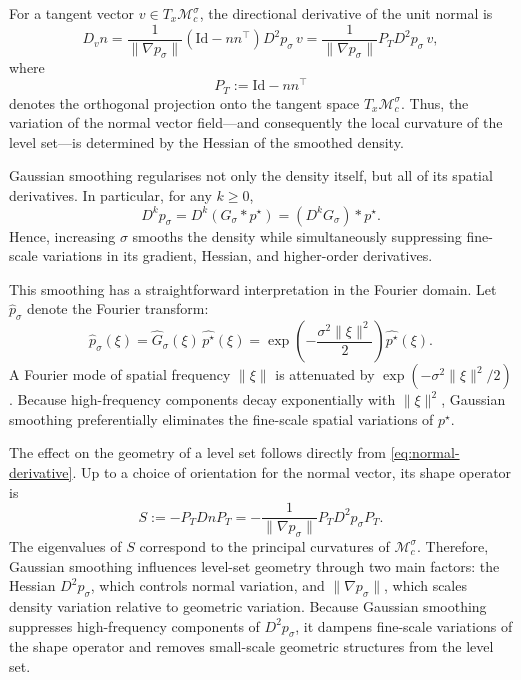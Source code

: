 \documentclass{article}
\newcommand{\M}{\mathcal{M}}
\newcommand{\Id}{\mathrm{Id}}
\theoremstyle{plain}
\theoremstyle{definition}
\theoremstyle{remark}
\begin{document}
For a tangent vector $v \in T_x\M_c^\sigma$, the directional derivative of the unit normal is
\begin{equation}
    D_v n
    =
    \frac{1}{\|\nabla p_{\sigma}\|}
    \left(\Id - n n^\top\right)
    D^2 p_{\sigma}\,v
    =
    \frac{1}{\|\nabla p_{\sigma}\|}
    P_T D^2 p_{\sigma}\,v,
    \label{eq:normal-derivative}
\end{equation}
where
\begin{equation}
    P_T := \Id - n n^\top
\end{equation}
denotes the orthogonal projection onto the tangent space $T_x\M_c^\sigma$. Thus, the variation of the normal vector field—and consequently the local curvature of the level set—is determined by the Hessian of the smoothed density.

Gaussian smoothing regularises not only the density itself, but all of its spatial derivatives. In particular, for any $k \geq 0$,
\begin{equation}
    D^k p_{\sigma}
    =
    D^k(G_{\sigma} * p^\star)
    =
    (D^k G_{\sigma}) * p^\star.
    \label{eq:derivative-smoothing}
\end{equation}
Hence, increasing $\sigma$ smooths the density while simultaneously suppressing fine-scale variations in its gradient, Hessian, and higher-order derivatives.

This smoothing has a straightforward interpretation in the Fourier domain. Let $\widehat{p}_{\sigma}$ denote the Fourier transform:
\begin{equation}
    \widehat{p}_{\sigma}(\xi)
    =
    \widehat{G}_{\sigma}(\xi)\,
    \widehat{p^\star}(\xi)
    =
    \exp\!\left(-\frac{\sigma^2\|\xi\|^2}{2}\right)
    \widehat{p^\star}(\xi).
    \label{eq:fourier-smoothing}
\end{equation}
A Fourier mode of spatial frequency $\|\xi\|$ is attenuated by $\exp(-\sigma^2\|\xi\|^2/2)$. Because high-frequency components decay exponentially with $\|\xi\|^2$, Gaussian smoothing preferentially eliminates the fine-scale spatial variations of $p^\star$.

The effect on the geometry of a level set follows directly from \eqref{eq:normal-derivative}. Up to a choice of orientation for the normal vector, its shape operator is
\begin{equation}
    S
    :=
    -P_T D n P_T
    =
    -\frac{1}{\|\nabla p_{\sigma}\|}
    P_T D^2 p_{\sigma} P_T.
    \label{eq:shape-operator}
\end{equation}
The eigenvalues of $S$ correspond to the principal curvatures of $\M_c^\sigma$. Therefore, Gaussian smoothing influences level-set geometry through two main factors: the Hessian $D^2 p_{\sigma}$, which controls normal variation, and $\|\nabla p_{\sigma}\|$, which scales density variation relative to geometric variation. Because Gaussian smoothing suppresses high-frequency components of $D^2 p_{\sigma}$, it dampens fine-scale variations of the shape operator and removes small-scale geometric structures from the level set.
\end{document}

